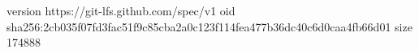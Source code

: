 version https://git-lfs.github.com/spec/v1
oid sha256:2cb035f07fd3fac51f9c85cba2a0c123f114fea477b36dc40c6d0caa4fb66d01
size 174888
